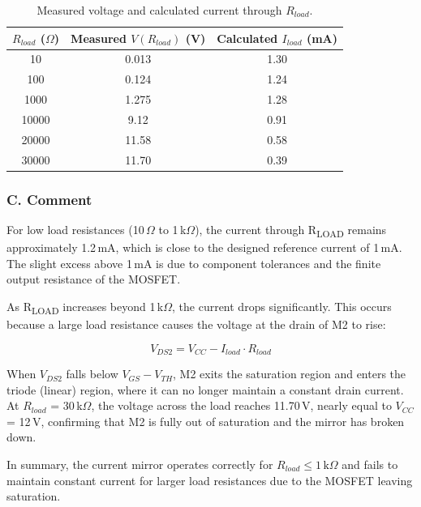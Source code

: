 \documentclass[12pt]{article}
\begin{document}
\begin{table}[h!]
    \centering
    \begin{tabular}{ccc}
    \toprule
    $R_{load}$ ($\Omega$) & Measured $V(R_{load})$ (V) & Calculated $I_{load}$ (mA) \\
    \midrule
    10      & 0.013  & 1.30 \\
    100     & 0.124  & 1.24 \\
    1000    & 1.275  & 1.28 \\
    10000   & 9.12   & 0.91 \\
    20000   & 11.58  & 0.58 \\
    30000   & 11.70  & 0.39 \\
    \bottomrule
    \end{tabular}
    \caption{Measured voltage and calculated current through $R_{load}$.}
\end{table}

\subsubsection*{C. Comment}

For low load resistances (10\,$\Omega$ to 1\,k$\Omega$), the current through
R\textsubscript{LOAD} remains approximately 1.2\,mA, which is close to the designed
reference current of 1\,mA. The slight excess above 1\,mA is due to component
tolerances and the finite output resistance of the MOSFET.

As R\textsubscript{LOAD} increases beyond 1\,k$\Omega$, the current drops
significantly. This occurs because a large load resistance causes the voltage at the
drain of M2 to rise:

\begin{equation}
    V_{DS2} = V_{CC} - I_{load} \cdot R_{load}
\end{equation}

\noindent When $V_{DS2}$ falls below $V_{GS} - V_{TH}$, M2 exits the saturation region
and enters the triode (linear) region, where it can no longer maintain a constant
drain current. At $R_{load}$ = 30\,k$\Omega$, the voltage across the load reaches
11.70\,V, nearly equal to $V_{CC}$ = 12\,V, confirming that M2 is fully out of
saturation and the mirror has broken down.

\noindent In summary, the current mirror operates correctly for
$R_{load} \leq 1\,\text{k}\Omega$ and fails to maintain constant current for larger
load resistances due to the MOSFET leaving saturation.
\end{document}
